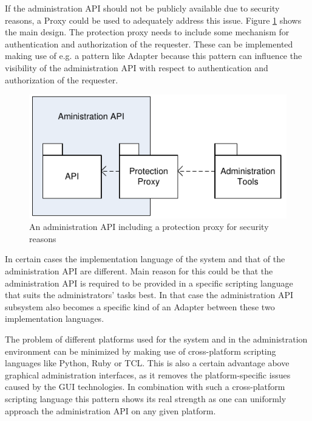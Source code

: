 If the administration API should not be publicly available due to security reasons, a {\sc Proxy} \cite{Buschmann1996} could be used to adequately address this issue. Figure \ref{fig:provideAPIDiagram-02} shows the main design. The protection proxy needs to include some mechanism for authentication and authorization of the requester. These can be implemented making use of e.g. a pattern like {\sc Adapter} \cite{Gamma95} because this pattern can influence the visibility of the administration API with respect to authentication and authorization of the requester.

\begin{figure}[h]
\centering
\includegraphics{patterns/provideAPIDiagram-02.pdf}
\caption{An administration API including a protection proxy for security reasons}
\label{fig:provideAPIDiagram-02}
\end{figure}

In certain cases the implementation language of the system and that of the administration API are different. Main reason for this could be that the administration API is required to be provided in a specific scripting language that suits the administrators' tasks best. In that case the administration API subsystem also becomes a specific kind of an {\sc Adapter} \cite{Gamma95} between these two implementation languages.

The problem of different platforms used for the system and in the administration environment can be minimized by making use of cross-platform scripting languages like Python, Ruby or TCL. This is also a certain advantage above graphical administration interfaces, as it removes the platform-specific issues caused by the GUI technologies. In combination with such a cross-platform scripting language this pattern shows its real strength as one can uniformly approach the administration API on any given platform.

